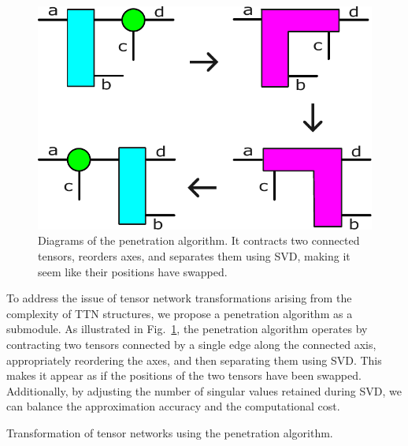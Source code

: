 \documentclass[12pt,dvipdfmx,twoside,openright]{report}
\begin{document}
\begin{figure}
    \centering
    \includegraphics[width=0.6\linewidth]{fig-decomposition-b.pdf}
    \caption{Diagrams of the penetration algorithm. It contracts two connected tensors, reorders axes, and separates them using SVD, making it seem like their positions have swapped.
    }
    \label{fig:decomposition-b}
\end{figure}

To address the issue of tensor network transformations arising from the complexity of TTN structures, we propose a penetration algorithm as a submodule.
As illustrated in Fig.~\ref{fig:decomposition-b}, the penetration algorithm operates by contracting two tensors connected by a single edge along the connected axis, appropriately reordering the axes, and then separating them using SVD.
This makes it appear as if the positions of the two tensors have been swapped.
Additionally, by adjusting the number of singular values retained during SVD, we can balance the approximation accuracy and the computational cost.

\begin{algorithm}[tbp]
 \caption{Transformation of tensor networks using the penetration algorithm.}
 \label{algorithm:transformation}
\end{algorithm}
\end{document}
